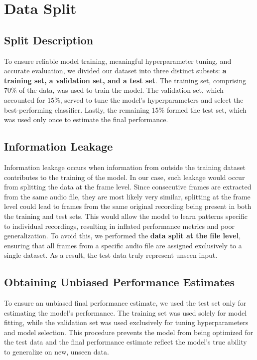 \documentclass{article}
\begin{document}

\section{Data Split}

\subsection{Split Description}
To ensure reliable model training, meaningful hyperparameter tuning, and accurate evaluation, we divided our dataset into three distinct subsets: \textbf{a training set, a validation set, and a test set}. The training set, comprising 70\% of the data, was used to train the model. The validation set, which accounted for 15\%, served to tune the model’s hyperparameters and select the best-performing classifier. Lastly, the remaining 15\% formed the test set, which was used only once to estimate the final performance.

 
\subsection{Information Leakage}
Information leakage occurs when information from outside the training dataset contributes to the training of the model. In our case, such leakage would occur from splitting the data at the frame level. Since consecutive frames are extracted from the same audio file, they are most likely very similar, splitting at the frame level could lead to frames from the same original recording being present in both the training and test sets. This would allow the model to learn patterns specific to individual recordings, resulting in inflated performance metrics and poor generalization. To avoid this, we performed the \textbf{data split at the file level}, ensuring that all frames from a specific audio file are assigned exclusively to a single dataset. As a result, the test data truly represent unseen input.  

\subsection{Obtaining Unbiased Performance Estimates}
To ensure an unbiased final performance estimate, we used the test set only for estimating the model’s performance. The training set was used solely for model fitting, while the validation set was used exclusively for tuning hyperparameters and model selection. This procedure prevents the model from being optimized for the test data and the final performance estimate reflect the model’s true ability to generalize on new, unseen data.
\end{document}
